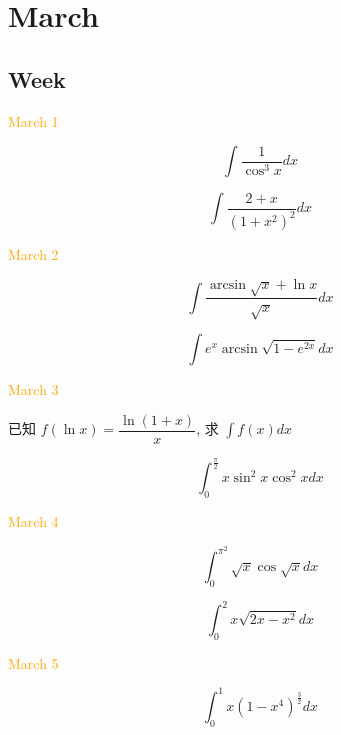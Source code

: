 \chapter{March}
\section{Week }
\textcolor{orange}{March 1}

\begin{example}[][Exam: 29.1.1]
	$$\int\dfrac{1}{\cos^{3} x}dx$$
\end{example}

\begin{example}[][Exam: 29.1.2]
	$$\int\dfrac{2+x}{(1+x^{2})^{2}}dx$$
\end{example}

\textcolor{orange}{March 2}

\begin{example}[][Exam: 29.1.3]
	$$\int\dfrac{\arcsin\sqrt{x}+\ln x}{\sqrt{x}}dx$$
\end{example}

\begin{example}[][Exam: 29.1.4]
	$$\int e^{x}\arcsin\sqrt{1-e^{2x}}dx$$
\end{example}

\textcolor{orange}{March 3}

\begin{example}[][Exam: 29.1.5]
	已知 $f(\ln x)=\dfrac{\ln(1+x)}{x}$, 求 $\int f(x)dx$
\end{example}

\begin{example}[][Exam: 29.1.6]
	$$\int_{0}^{\frac{\pi}{2}}x\sin^{2}x\cos^{2}xdx$$
\end{example}

\textcolor{orange}{March 4}

\begin{example}[][Exam: 29.1.7]
	$$\int_{0}^{\pi^{2}}\sqrt{x}\cos\sqrt{x}dx$$
\end{example}

\begin{example}[][Exam: 29.1.8]
	$$\int_{0}^{2}x\sqrt{2x-x^{2}}dx$$
\end{example}

\textcolor{orange}{March 5}

\begin{example}[][Exam: 29.1.9]
	$$\int_{0}^{1}x(1-x^{4})^{\frac{3}{2}}dx$$
\end{example}

